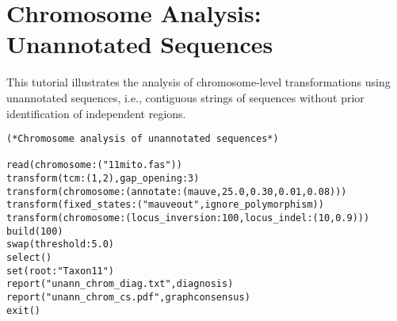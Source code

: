 
\section{Chromosome Analysis: Unannotated Sequences}{\label{tutorial8}}

This tutorial illustrates the analysis of chromosome-level transformations using 
unannotated sequences, i.e., contiguous strings of sequences without prior 
identification of independent regions. 

\begin{verbatim}
(*Chromosome analysis of unannotated sequences*)

read(chromosome:("11mito.fas"))
transform(tcm:(1,2),gap_opening:3)
transform(chromosome:(annotate:(mauve,25.0,0.30,0.01,0.08)))
transform(fixed_states:("mauveout",ignore_polymorphism))
transform(chromosome:(locus_inversion:100,locus_indel:(10,0.9)))
build(100)
swap(threshold:5.0)
select()
set(root:"Taxon11")
report("unann_chrom_diag.txt",diagnosis)
report("unann_chrom_cs.pdf",graphconsensus)
exit()
\end{verbatim}

